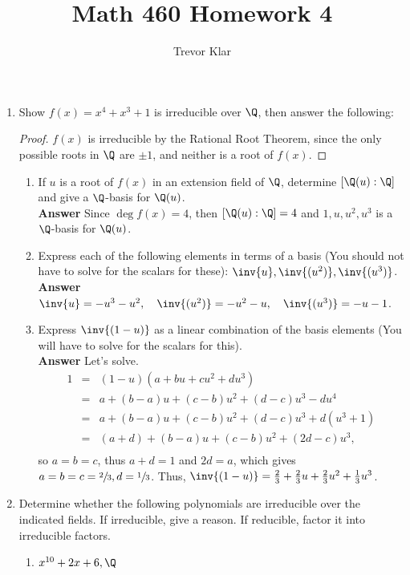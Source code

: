 \documentclass[letterpaper]{article}
\title{Math 460 \linebreak
Homework 4}
\author{Trevor Klar}
\begin{document}
\maketitle

\begin{enumerate}
	\item Show	$f(x) = x^4 + x^3 + 1$ is irreducible over $\Q$, then answer the following:
	\begin{proof}
		$f(x)$ is irreducible by the Rational Root Theorem, since the only possible roots in $\Q$ are $\pm1$, and neither is a root of $f(x)$. 
	\end{proof}
		\begin{enumerate}[label=(\roman*)]
			\item If $u$ is a root of $f(x)$ in an extension field of $\Q$, determine $[\Q(u):\Q]$ and give a $\Q$-basis for $\Q(u)$. \\
			\textbf{Answer} Since $\deg f(x)=4$, then $[\Q(u):\Q]=4$ and $1, u, u^{2}, u^{3}$ is a $\Q$-basis for $\Q(u)$. 
			\item Express each of the following elements in terms of a basis (You should not have to solve for the scalars for these): $\inv{u}, \inv{(u^2)}, \inv{(u^3)}$. \\
			\textbf{Answer} $\inv{u}=-u^{3}-u^{2}, \quad \inv{(u^2)}=-u^{2}-u, \quad \inv{(u^3)}=-u-1$. 
			\item Express $\inv{(1-u)}$ as a linear combination of the basis elements (You will have to solve for the scalars for this).\\
			\textbf{Answer} Let's solve. 
				\[\begin{array}{rcl}
					1&=&(1-u)(a+bu+cu^2+du^3)\\
					&=&a+(b-a)u+(c-b)u^2+(d-c)u^3-du^4\\
					&=&a+(b-a)u+(c-b)u^2+(d-c)u^3+d(u^3+1)\\
					&=&(a+d)+(b-a)u+(c-b)u^2+(2d-c)u^3,\\
				\end{array}\]
				so $a=b=c$, thus $a+d=1$ and $2d=a$, which gives $a=b=c=\sfrac{2}{3}, d=\sfrac{1}{3}$. Thus, $\inv{(1-u)}=\frac{2}{3}+\frac{2}{3}u+\frac{2}{3}u^2+\frac{1}{3}u^3$.
		\end{enumerate}
	\item Determine whether the following polynomials are irreducible over the indicated fields. If irreducible, give a reason. If reducible, factor it into irreducible factors.
		\begin{enumerate}[label=(\roman*)]
			\item $x^{10}+2x+6, \Q$ \\

\end{enumerate}
\end{enumerate}
\end{document}
